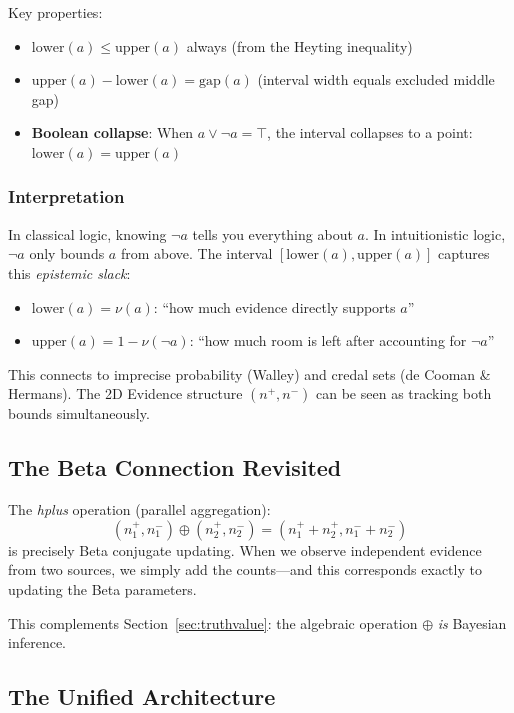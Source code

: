 \documentclass[]{article}
\begin{document}
Key properties:
\begin{itemize}
\item $\text{lower}(a) \leq \text{upper}(a)$ always (from the Heyting
  inequality)
\item $\text{upper}(a) - \text{lower}(a) = \text{gap}(a)$ (interval
  width equals excluded middle gap)
\item \textbf{Boolean collapse}: When $a \vee \neg a = \top$, the
  interval collapses to a point: $\text{lower}(a) = \text{upper}(a)$
\end{itemize}

\subsubsection{Interpretation}

In classical logic, knowing $\neg a$ tells you everything about $a$.
In intuitionistic logic, $\neg a$ only bounds $a$ from above.  The
interval $[\text{lower}(a), \text{upper}(a)]$ captures this
\emph{epistemic slack}:

\begin{itemize}
\item $\text{lower}(a) = \nu(a)$: ``how much evidence directly
  supports $a$''
\item $\text{upper}(a) = 1 - \nu(\neg a)$: ``how much room is left
  after accounting for $\neg a$''
\end{itemize}

This connects to imprecise probability (Walley) and credal sets (de
Cooman \& Hermans).  The 2D Evidence structure $(n^+, n^-)$ can be
seen as tracking both bounds simultaneously.

\subsection{The Beta Connection Revisited}

The \emph{hplus} operation (parallel aggregation):
$$(n^+_1, n^-_1) \oplus (n^+_2, n^-_2) = (n^+_1 + n^+_2, n^-_1 + n^-_2)$$
is precisely Beta conjugate updating.  When we observe independent evidence
from two sources, we simply add the counts---and this corresponds exactly
to updating the Beta parameters.

This complements Section~\ref{sec:truthvalue}: the algebraic operation
$\oplus$ \emph{is} Bayesian inference.

\subsection{The Unified Architecture}
\end{document}
